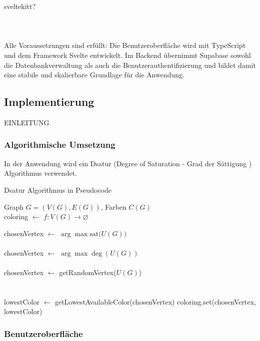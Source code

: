 sveltekitt?\\\\\\\\
Alle Voraussetzungen sind erfüllt: Die Benutzeroberfläche wird mit TypeScript und dem Framework Svelte entwickelt. Im Backend übernimmt Supabase sowohl die Datenbankverwaltung als auch die Benutzerauthentifizierung und bildet damit eine stabile und skalierbare Grundlage für die Anwendung.
\newpage
\subsection{Implementierung}
EINLEITUNG
\subsubsection{Algorithmische Umsetzung}
In der Anwendung wird ein Dsatur (Degree of Saturation - Grad der Sättigung ) Algorithmus verwendet.

\begin{algorithm}
\caption{Dsatur Algorithmus in Pseudocode}\label{alg:cap}
\begin{algorithmic}
\Require Graph $G = (V(G), E(G))$, Farben $C(G)$\\
\State coloring $\gets$ $f: V(G) \rightarrow \varnothing$\\




    \State chosenVertex $\gets$ $\arg \max \text{sat($U(G)$)}$\\
    
    \\
        \State chosenVertex $\gets$ $\arg \max \deg(U(G))$\\
        
        \\
            \State chosenVertex $\gets$ getRandomVertex($U(G)$)\\
        \EndIf\\
    \EndIf\\
    \State lowestColor $\gets$ getLowestAvailableColor(chosenVertex)
    \State coloring.set(chosenVertex, lowestColor)\\
\EndWhile

\end{algorithmic}
\end{algorithm}
\subsubsection{Benutzeroberfläche}